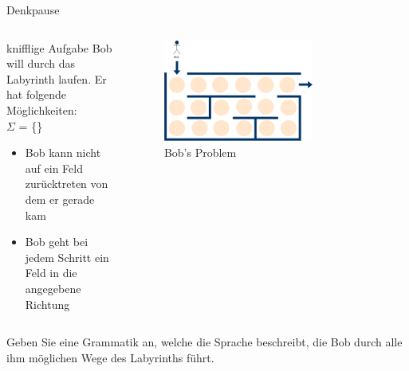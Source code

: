 {
\begin{frame}{Denkpause}
    \begin{columns}
        \begin{alertblock}{knifflige Aufgabe}
            Bob will durch das Labyrinth laufen. Er hat folgende Möglichkeiten:\\
            $\Sigma$ = \{\text{\Rewind, \MoveUp, \Forward, \MoveDown}\}
            \begin{itemize}
                \item Bob kann nicht auf ein Feld zurücktreten von dem er gerade kam
                \item Bob geht bei jedem Schritt ein Feld in die angegebene Richtung
            \end{itemize}
        \end{alertblock}
        \begin{figure}
            \centering
            \includegraphics[width=0.7\textwidth]{../figures/GBeispiel.png}
            \caption{Bob's Problem}

        \end{figure}
    \end{columns}
    \alert{Geben Sie eine Grammatik an, welche die Sprache beschreibt, die Bob durch alle ihm möglichen Wege des Labyrinths führt.}
\end{frame}
}

